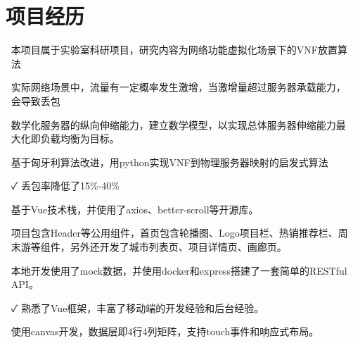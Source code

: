 \documentclass[14pt]{resume}
\begin{document}
\section{\faUsers\ 项目经历}

\begin{onehalfspacing}
\begin{itemize}
    \item[\faFlagO] 本项目属于实验室科研项目，研究内容为网络功能虚拟化场景下的VNF放置算法
    \item[\faFlagO] 实际网络场景中，流量有一定概率发生激增，当激增量超过服务器承载能力，会导致丢包
    \item[\faCode] 数学化服务器的纵向伸缩能力，建立数学模型，以实现总体服务器伸缩能力最大化即负载均衡为目标。
    \item[\faCode] 基于匈牙利算法改进，用python实现VNF到物理服务器映射的启发式算法
    \item[\faCheck] 丢包率降低了15\%-40\%
\end{itemize}
\end{onehalfspacing}

\begin{onehalfspacing}
\begin{itemize}
    \item[\faFlagO] 基于Vue技术栈，并使用了axios、better-scroll等开源库。
    \item[\faFlagO] 项目包含Header等公用组件，首页包含轮播图、Logo项目栏、热销推荐栏、周末游等组件，另外还开发了城市列表页、项目详情页、画廊页。
    \item[\faCode] 本地开发使用了mock数据，并使用docker和express搭建了一套简单的RESTful API。
    \item[\faCheck] 熟悉了Vue框架，丰富了移动端的开发经验和后台经验。
\end{itemize}
\end{onehalfspacing}

\begin{onehalfspacing}
\begin{itemize}
    \item[\faCode] 使用canvas开发，数据层即4行4列矩阵，支持touch事件和响应式布局。
\end{itemize}
\end{onehalfspacing}
\end{document}

